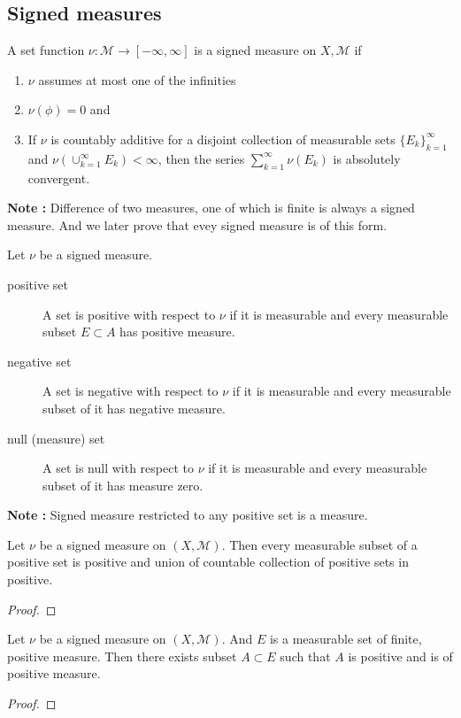 \subsection{Signed measures}
\begin{definition}
	A set function $\nu : \mathcal{M} \to [-\infty,\infty]$ is a signed measure on $X,\mathcal{M}$ if
	\begin{enumerate}
		\item $\nu$ assumes at most one of the infinities
		\item $\nu(\phi) = 0$ and
		\item If $\nu$ is countably additive for a disjoint collection of measurable sets $\{ E_k \}_{k=1}^\infty$ and $\nu(\cup_{k=1}^\infty E_k) < \infty$, then the series $\sum_{k=1}^\infty \nu(E_k)$ is absolutely convergent.
	\end{enumerate}
\end{definition}
\textbf{Note : } Difference of two measures, one of which is finite is always a signed measure. And we later prove that evey signed measure is of this form.

\begin{definition}
	Let $\nu$ be a signed measure.
\begin{description}
	\item[positive set] A set is positive with respect to $\nu$ if it is measurable and every measurable subset $E \subset A$ has positive measure.
	\item[negative set] A set is negative with respect to $\nu$ if it is measurable and every measurable subset of it has negative measure.
	\item[null (measure) set] A set is null with respect to $\nu$ if it is measurable and every measurable subset of it has measure zero.
\end{description}
\end{definition}

\textbf{Note : } Signed measure restricted to any positive set is a measure.

\begin{theorem}
	Let $\nu$ be a signed measure on $(X,\mathcal{M})$.
	Then every measurable subset of a positive set is positive and union of countable collection of positive sets in positive.
\end{theorem}
\begin{proof}
\end{proof}

\begin{lemma}[Hahn]
	Let $\nu$ be a signed measure on $(X,\mathcal{M})$.
	And $E$ is a measurable set of finite, positive measure.
	Then there exists subset $A \subset E$ such that $A$ is positive and is of positive measure.
\end{lemma}
\begin{proof}
\end{proof}

